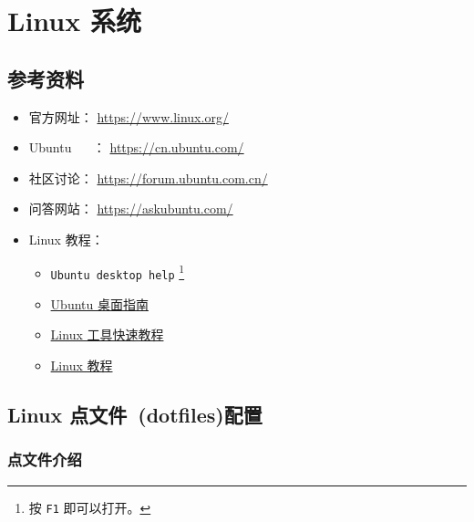 \documentclass[
    11pt,
    cite=authoryear,
    device=normal,
    lang=cn,
    mode=simple,
    result=answer,
    toc=onecol,
]{elegantbook_sierxue}
\begin{document}
\newpage
\section{Linux 系统}%
\label{sec:linux}

\subsection{参考资料}%
\label{sub:linux-refs}

\begin{itemize}
    \item 官方网址： \href{https://www.linux.org/}{https://www.linux.org/}
    \item Ubuntu ~ ~： \href{https://cn.ubuntu.com/}{https://cn.ubuntu.com/}
    \item 社区讨论：
        \href{https://forum.ubuntu.com.cn/}{https://forum.ubuntu.com.cn/}
    \item 问答网站：
        \href{https://askubuntu.com/}{https://askubuntu.com/}
    \item Linux 教程：
        \begin{itemize}
            \item \lstinline{Ubuntu desktop help}
                \footnote{按 \lstinline{F1} 即可以打开。}
            \item \href{https://help.ubuntu.com/lts/ubuntu-help/index.html}
                {Ubuntu 桌面指南}
            \item \href{https://linuxtools-rst.readthedocs.io/zh_CN/latest/}
                {Linux 工具快速教程}
            \item \href{https://dunwu.github.io/linux-tutorial/#/}
                {Linux 教程}
        \end{itemize}
\end{itemize}



\subsection{Linux 点文件~(dotfiles)配置}%
\label{sub:dotfiles-settings}

\subsubsection{点文件介绍}%
\label{ssub:dotfiles-settings-intro}
\end{document}
